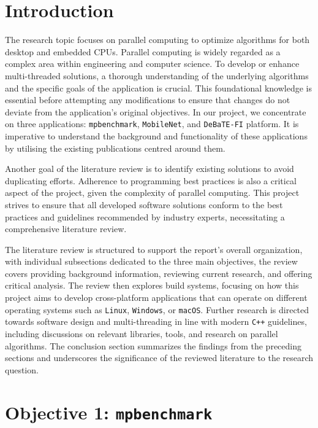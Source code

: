 \section{Introduction}
The research topic focuses on parallel computing to optimize algorithms for both desktop and embedded CPUs. Parallel computing is widely regarded as a complex area within engineering and computer science. To develop or enhance multi-threaded solutions, a thorough understanding of the underlying algorithms and the specific goals of the application is crucial. This foundational knowledge is essential before attempting any modifications to ensure that changes do not deviate from the application’s original objectives. In our project, we concentrate on three applications: \texttt{mpbenchmark}, \texttt{MobileNet}, and \texttt{DeBaTE-FI} platform. It is imperative to understand the background and functionality of these applications by utilising the existing publications centred around them. 

Another goal of the literature review is to identify existing solutions to avoid duplicating efforts. Adherence to programming best practices is also a critical aspect of the project, given the complexity of parallel computing. This project strives to ensure that all developed software solutions conform to the best practices and guidelines recommended by industry experts, necessitating a comprehensive literature review.

The literature review is structured to support the report's overall organization, with individual subsections dedicated to the three main objectives, the review covers providing background information, reviewing current research, and offering critical analysis. The review then explores build systems, focusing on how this project aims to develop cross-platform applications that can operate on different operating systems such as \texttt{Linux}, \texttt{Windows}, or \texttt{macOS}. Further research is directed towards software design and multi-threading in line with modern \texttt{C++} guidelines, including discussions on relevant libraries, tools, and research on parallel algorithms. The conclusion section summarizes the findings from the preceding sections and underscores the significance of the reviewed literature to the research question.

\section{Objective 1: \texttt{mpbenchmark}}

